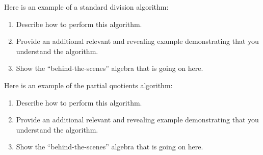 \documentclass[nooutcomes]{ximera}
\begin{document}
\begin{problem}Here is an example of a standard division algorithm:
\begin{image}
\end{image}
\begin{enumerate}
\item Describe how to perform this algorithm.
\item Provide an additional relevant and revealing example
  demonstrating that you understand the algorithm.
\item Show the ``behind-the-scenes'' algebra that is going on here.
\end{enumerate}
\end{problem} 

\begin{problem}\label{P:DS} Here is an example of the partial quotients
  algorithm:
\begin{image}
\end{image}
\begin{enumerate}
\item Describe how to perform this algorithm.
\item Provide an additional relevant and revealing example
  demonstrating that you understand the algorithm.
\item Show the ``behind-the-scenes'' algebra that is going on here.
\end{enumerate}
\end{problem} 
\end{document}
